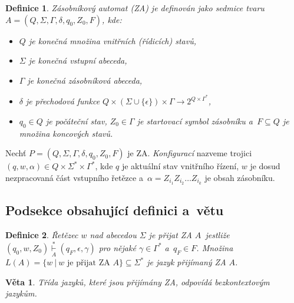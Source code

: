 \documentclass[11pt, twocolumn, a4paper]{article}
\begin{document}
\newtheorem{definition}{Definice}
\begin{definition}
	\label{def_1}
	\emph{Zásobníkový automat} (ZA) je definován jako sedmice tvaru $A = (Q, \Sigma, 
	\Gamma, \delta, q_0, Z_0, F)$, kde:
	\begin{itemize}
		\item $Q$ je konečná množina \emph{vnitřních (řídicích) stavů},
		\item $\Sigma$ je konečná \emph{vstupní abeceda},
		\item $\Gamma$ je konečná \emph{zásobníková abeceda},
		\item $\delta$ je \emph{přechodová funkce} $Q \times (\Sigma \cup \{
		      \epsilon \}) \times \Gamma \to 2^{Q \times \Gamma^*}$,
		\item $q_0 \in Q$ je \emph{počáteční stav}, $Z_0 \in \Gamma$ je 
		      \emph{startovací symbol zásobníku} a~$F \subseteq Q$ je množina \emph{koncových stavů}.
	\end{itemize}
\end{definition}
Nechť $P = (Q, \Sigma, \Gamma, \delta, q_0, Z_0, F)$ je ZA. \emph{Konfigurací} nazveme
trojici $(q, w, \alpha) \in Q \times \Sigma^* \times \Gamma^*$, kde $q$ je aktuální stav
vnitřního řízení, $w$ je dosud nezpracovaná část vstupního řetězce a~$\alpha = Z_{i_1} Z_{i_2} \dots Z_{i_k}$ je obsah zásobníku.

\subsection{Podsekce obsahující definici a~větu}
\begin{definition}
	\label{def_2}
	\emph{Řetězec $w$ nad abecedou $\Sigma$ je přijat ZA $A$}~jestliže $(q_0, w, Z_0) \overset{*}{\underset{A}{\vdash}} (q_F, \epsilon, \gamma)$
	pro nějaké $\gamma \in \Gamma^*$ a~$q_F \in F$. Množina $L(A) = \{w \ \vert \ w \text{ je přijat ZA }A\} \subseteq \Sigma^*$ je \emph{jazyk přijímaný ZA} $A$.
\end{definition}

\newtheorem{theorem}{Věta}
\begin{theorem}
	\label{thm_1}
	Třída jazyků, které jsou přijímány ZA, odpovídá \emph{bezkontextovým jazykům}.
\end{theorem}
\end{document}
